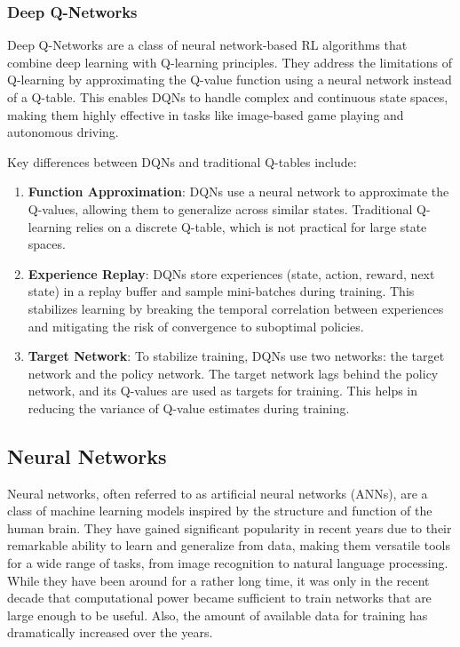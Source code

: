 \subsubsection{Deep Q-Networks}

Deep Q-Networks are a class of neural network-based RL algorithms that combine deep learning with Q-learning principles. They address the limitations of Q-learning by approximating the Q-value function using a neural network instead of a Q-table. This enables DQNs to handle complex and continuous state spaces, making them highly effective in tasks like image-based game playing and autonomous driving.

Key differences between DQNs and traditional Q-tables include:

\begin{enumerate}
	\item \textbf{Function Approximation}: DQNs use a neural network to approximate the Q-values, allowing them to generalize across similar states. Traditional Q-learning relies on a discrete Q-table, which is not practical for large state spaces.
	
	\item \textbf{Experience Replay}: DQNs store experiences (state, action, reward, next state) in a replay buffer and sample mini-batches during training. This stabilizes learning by breaking the temporal correlation between experiences and mitigating the risk of convergence to suboptimal policies.
	
	\item \textbf{Target Network}: To stabilize training, DQNs use two networks: the target network and the policy network. The target network lags behind the policy network, and its Q-values are used as targets for training. This helps in reducing the variance of Q-value estimates during training.
\end{enumerate}


\subsection{Neural Networks}
Neural networks, often referred to as artificial neural networks (ANNs), are a class of machine learning models inspired by the structure and function of the human brain. They have gained significant popularity in recent years due to their remarkable ability to learn and generalize from data, making them versatile tools for a wide range of tasks, from image recognition to natural language processing. While they have been around for a rather long time, it was only in the recent decade that computational power became sufficient to train networks that are large enough to be useful. Also, the amount of available data for training has dramatically increased over the years.


